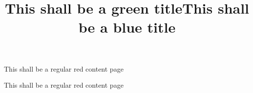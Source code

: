 \documentclass[aspectratio=169]{beamer}
\begin{document}
\title{This shall be a green title}
\begin{frame}[green]
\titlepage
\end{frame}

\begin{frame}
This shall be a regular red content page
\end{frame}

\title{This shall be a blue title}
\begin{frame}[blue]
\titlepage
\end{frame}

\begin{frame}
This shall be a regular red content page
\end{frame}
\end{document}
